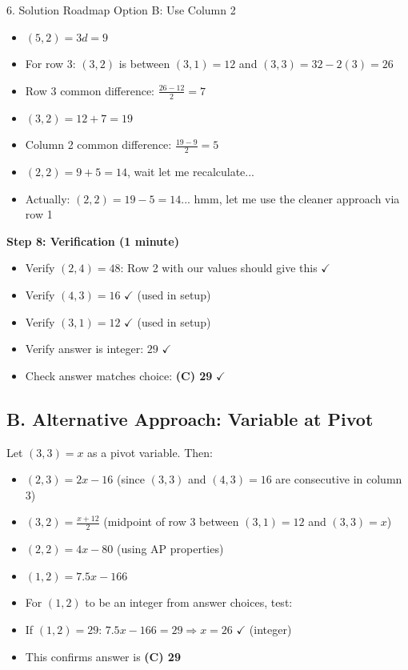 \documentclass[12pt]{article}
\begin{document}
\begin{roadmapbox}{6. Solution Roadmap}
Option B: Use Column 2
\begin{itemize}
    \item $(5,2) = 3d = 9$
    \item For row 3: $(3,2)$ is between $(3,1) = 12$ and $(3,3) = 32 - 2(3) = 26$
    \item Row 3 common difference: $\frac{26 - 12}{2} = 7$
    \item $(3,2) = 12 + 7 = 19$
    \item Column 2 common difference: $\frac{19 - 9}{2} = 5$
    \item $(2,2) = 9 + 5 = 14$, wait let me recalculate...
    \item Actually: $(2,2) = 19 - 5 = 14$... hmm, let me use the cleaner approach via row 1
\end{itemize}

\textbf{Step 8: Verification (1 minute)}
\begin{itemize}
    \item Verify $(2,4) = 48$: Row 2 with our values should give this $\checkmark$
    \item Verify $(4,3) = 16$ $\checkmark$ (used in setup)
    \item Verify $(3,1) = 12$ $\checkmark$ (used in setup)
    \item Verify answer is integer: $29$ $\checkmark$
    \item Check answer matches choice: \textbf{(C) 29} $\checkmark$
\end{itemize}

\subsection*{B. Alternative Approach: Variable at Pivot}

Let $(3,3) = x$ as a pivot variable. Then:
\begin{itemize}
    \item $(2,3) = 2x - 16$ (since $(3,3)$ and $(4,3) = 16$ are consecutive in column 3)
    \item $(3,2) = \frac{x + 12}{2}$ (midpoint of row 3 between $(3,1) = 12$ and $(3,3) = x$)
    \item $(2,2) = 4x - 80$ (using AP properties)
    \item $(1,2) = 7.5x - 166$
    \item For $(1,2)$ to be an integer from answer choices, test:
    \item If $(1,2) = 29$: $7.5x - 166 = 29 \Rightarrow x = 26$ $\checkmark$ (integer)
    \item This confirms answer is \textbf{(C) 29}
\end{itemize}


\end{roadmapbox}
\end{document}
